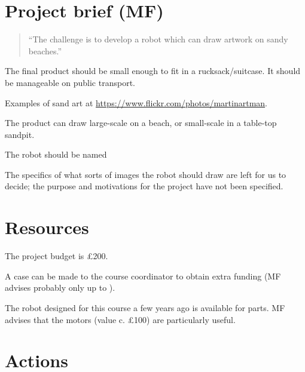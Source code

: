 \documentclass[a4paper,11pt,twoside,class=meetingmins,crop=false]{standalone}
\begin{document}
\section{Project brief (MF)}
\begin{quotation}
``The challenge is to develop a robot which can draw artwork on sandy beaches.''
\end{quotation}
\begin{hiddenitems}
    \item The final product should be small enough to fit in a rucksack/suitcase. It should be manageable on public transport.
    \item Examples of sand art at \url{https://www.flickr.com/photos/martinartman}.
    \item The product can draw large-scale on a beach, or small-scale in a table-top sandpit.
    \item The robot should be named
    \item The specifics of what sorts of images the robot should draw are left for us to decide; the purpose and motivations for the project have not been specified.
\end{hiddenitems}

\section{Resources}
\begin{hiddenitems}
    \item The project budget is \pounds{200}.
    \item A case can be made to the course coordinator to obtain extra funding (MF advises probably only up to ).
    \item The robot designed for this course a few years ago is available for parts. MF advises that the motors (value c. \pounds{100}) are particularly useful.
\end{hiddenitems}

\vspace{1em}
\vspace{1em}

\section{Actions}
\begin{items}
\end{items}
%
\end{document}
